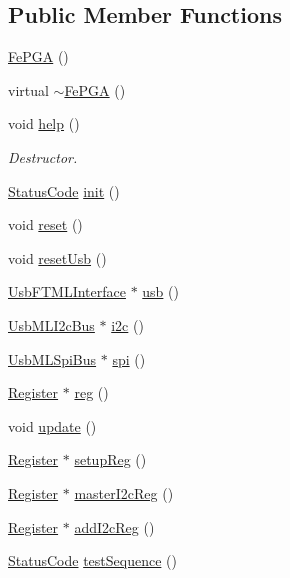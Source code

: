\subsection*{Public Member Functions}
\begin{DoxyCompactItemize}
\item 
\hyperlink{classFePGA_a377ae8860fbb3162e0c49dd08197a670}{Fe\+P\+GA} ()
\item 
virtual \hyperlink{classFePGA_aa445095a44c521b6b7803feaef6c16ba}{$\sim$\+Fe\+P\+GA} ()
\item 
void \hyperlink{classFePGA_ae6425fbad1a8db57025efaf387a6f41b}{help} ()
\begin{DoxyCompactList}\small\item\em Destructor. \end{DoxyCompactList}\item 
\hyperlink{classStatusCode}{Status\+Code} \hyperlink{classFePGA_a5355858b1b8deedcc12acff80f025804}{init} ()
\item 
void \hyperlink{classFePGA_abdf7a9dd901351a7eafd748d35172a3c}{reset} ()
\item 
void \hyperlink{classFePGA_a79d95b2fccf4d2ea473e6cf6980d6cf6}{reset\+Usb} ()
\item 
\hyperlink{classUsbFTMLInterface}{Usb\+F\+T\+M\+L\+Interface} $\ast$ \hyperlink{classFePGA_a4a7889dc3c2f88f623876ca475e66410}{usb} ()
\item 
\hyperlink{classUsbMLI2cBus}{Usb\+M\+L\+I2c\+Bus} $\ast$ \hyperlink{classFePGA_a1553db5010cce9e3495aa3060baf0b3c}{i2c} ()
\item 
\hyperlink{classUsbMLSpiBus}{Usb\+M\+L\+Spi\+Bus} $\ast$ \hyperlink{classFePGA_ab54f9f61e87f1cced6c4ba19eb38a848}{spi} ()
\item 
\hyperlink{classRegister}{Register} $\ast$ \hyperlink{classFePGA_a7b9b52c0a8b2080ed6a1163f9dfc5553}{reg} ()
\item 
void \hyperlink{classFePGA_ad23605ae261d2aa0562cbb732661b2c4}{update} ()
\item 
\hyperlink{classRegister}{Register} $\ast$ \hyperlink{classFePGA_aa0657c6ef809f3f6b54613f237750cc4}{setup\+Reg} ()
\item 
\hyperlink{classRegister}{Register} $\ast$ \hyperlink{classFePGA_a2bcd2c468fc3e1bcadc9bd8800b325a0}{master\+I2c\+Reg} ()
\item 
\hyperlink{classRegister}{Register} $\ast$ \hyperlink{classFePGA_a64feabdb09e65b1b4b1376a4da713570}{add\+I2c\+Reg} ()
\item 
\hyperlink{classStatusCode}{Status\+Code} \hyperlink{classFePGA_a3d5a3231a960cd451bb37bb9120422e9}{test\+Sequence} ()

\end{DoxyCompactItemize}
